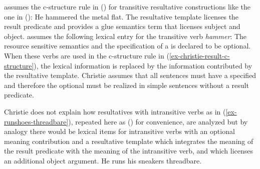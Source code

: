 \citet{Christie2010a} assumes the c-structure rule in () for transitive resultative
constructions like the one in ():
\ea
He hammered the metal flat.
\z
\ea
\label{ex-christie-result-c-structure}
\z
The resultative template licenses the result predicate and provides a glue semantics term that
licenses subject and object. \citet{Christie2010a} assumes the following lexical entry for
the transitive verb \emph{hammer}:
\ea
{}
\z
The resource sensitive semantics and the specification of a \predv is declared to be optional. When
these verbs are used in the c-structure rule in (\ref{ex-christie-result-c-structure}), the lexical
information is replaced by the information contributed by the resultative template. Christie assumes
that all sentences must have a specified \predv and therefore the optional \predv must be realized
in simple sentences without a result predicate.  

Christie does not explain how resultatives with intransitive verbs as in
(\ref{ex-runshoes-threadbare}), repeated here as () for convenience, are analyzed but by analogy there
would be lexical items for intransitive verbs with an optional meaning contribution and a
resultative template which integrates the meaning of the result predicate with the meaning of the
intransitive verb, and which licenses an additional object argument.
\ea
\label{ex-runshoes-threadbare-two}
He runs his sneakers threadbare.
\z


